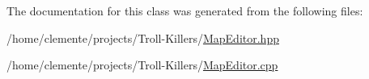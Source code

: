 The documentation for this class was generated from the following files\+:\begin{DoxyCompactItemize}
\item 
/home/clemente/projects/\+Troll-\/\+Killers/\hyperlink{_map_editor_8hpp}{Map\+Editor.\+hpp}\item 
/home/clemente/projects/\+Troll-\/\+Killers/\hyperlink{_map_editor_8cpp}{Map\+Editor.\+cpp}\end{DoxyCompactItemize}
